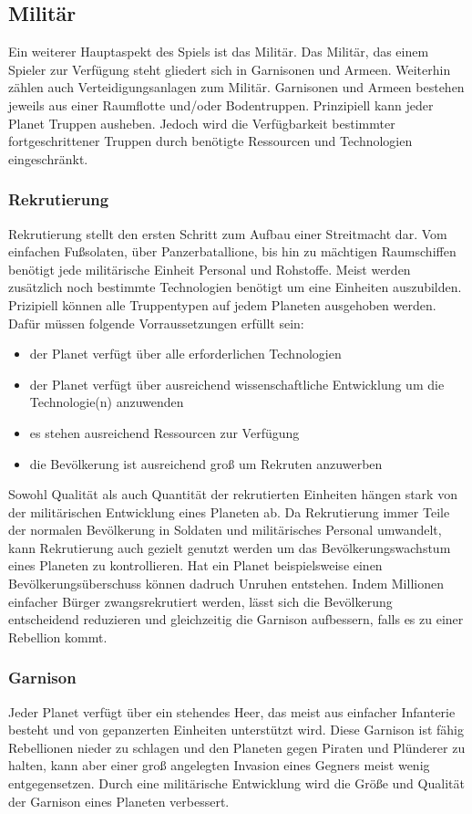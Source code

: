 \documentclass[11pt, a4paper]{article}
\begin{document}
\subsection{Militär}
Ein weiterer Hauptaspekt des Spiels ist das Militär. Das Militär, das einem Spieler zur Verfügung steht
gliedert sich in Garnisonen und Armeen. Weiterhin zählen auch Verteidigungsanlagen zum Militär.
Garnisonen und Armeen bestehen jeweils aus einer Raumflotte und/oder Bodentruppen. Prinzipiell kann jeder
Planet Truppen ausheben. Jedoch wird die Verfügbarkeit bestimmter fortgeschrittener Truppen durch benötigte
Ressourcen und Technologien eingeschränkt.
%
\subsubsection{Rekrutierung}
Rekrutierung stellt den ersten Schritt zum Aufbau einer Streitmacht dar. Vom einfachen Fußsolaten, über
Panzerbatallione, bis hin zu mächtigen Raumschiffen benötigt jede militärische Einheit Personal und Rohstoffe.
Meist werden zusätzlich noch bestimmte Technologien benötigt um eine Einheiten auszubilden. Prizipiell können
alle Truppentypen auf jedem Planeten ausgehoben werden. Dafür müssen folgende Vorraussetzungen erfüllt sein:
\begin{itemize}
	\item der Planet verfügt über alle erforderlichen Technologien
	\item der Planet verfügt über ausreichend wissenschaftliche Entwicklung um die Technologie(n) anzuwenden
	\item es stehen ausreichend Ressourcen zur Verfügung
	\item die Bevölkerung ist ausreichend groß um Rekruten anzuwerben
\end{itemize}
%
Sowohl Qualität als auch Quantität der rekrutierten Einheiten hängen stark von der militärischen Entwicklung
eines Planeten ab. Da Rekrutierung immer Teile der normalen Bevölkerung in Soldaten und militärisches Personal
umwandelt, kann Rekrutierung auch gezielt genutzt werden um das Bevölkerungswachstum eines Planeten zu
kontrollieren. Hat ein Planet beispielsweise einen Bevölkerungsüberschuss können dadruch Unruhen entstehen.
Indem Millionen einfacher Bürger zwangsrekrutiert werden, lässt sich die Bevölkerung entscheidend reduzieren
und gleichzeitig die Garnison aufbessern, falls es zu einer Rebellion kommt.
%
\subsubsection{Garnison}
Jeder Planet verfügt über ein stehendes Heer, das meist aus einfacher Infanterie besteht und von gepanzerten
Einheiten unterstützt wird. Diese Garnison ist fähig Rebellionen nieder zu schlagen und den Planeten gegen
Piraten und Plünderer zu halten, kann aber einer groß angelegten Invasion eines Gegners meist wenig
entgegensetzen. Durch eine militärische Entwicklung wird die Größe und Qualität der Garnison eines Planeten
verbessert.
%
\end{document}
